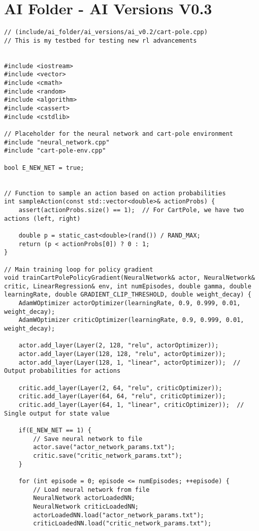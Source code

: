\section*{AI Folder - AI Versions V0.3}
\begin{verbatim}
// (include/ai_folder/ai_versions/ai_v0.2/cart-pole.cpp)
// This is my testbed for testing new rl advancements


#include <iostream>
#include <vector>
#include <cmath>
#include <random>
#include <algorithm>
#include <cassert>
#include <cstdlib>

// Placeholder for the neural network and cart-pole environment
#include "neural_network.cpp"
#include "cart-pole-env.cpp"

bool E_NEW_NET = true;


// Function to sample an action based on action probabilities
int sampleAction(const std::vector<double>& actionProbs) {
    assert(actionProbs.size() == 1);  // For CartPole, we have two actions (left, right)
    
    double p = static_cast<double>(rand()) / RAND_MAX;
    return (p < actionProbs[0]) ? 0 : 1;
}

// Main training loop for policy gradient
void trainCartPolePolicyGradient(NeuralNetwork& actor, NeuralNetwork& critic, LinearRegression& env, int numEpisodes, double gamma, double learningRate, double GRADIENT_CLIP_THRESHOLD, double weight_decay) {
    AdamWOptimizer actorOptimizer(learningRate, 0.9, 0.999, 0.01, weight_decay);
    AdamWOptimizer criticOptimizer(learningRate, 0.9, 0.999, 0.01, weight_decay);

    actor.add_layer(Layer(2, 128, "relu", actorOptimizer));
    actor.add_layer(Layer(128, 128, "relu", actorOptimizer));
    actor.add_layer(Layer(128, 1, "linear", actorOptimizer));  // Output probabilities for actions

    critic.add_layer(Layer(2, 64, "relu", criticOptimizer));
    critic.add_layer(Layer(64, 64, "relu", criticOptimizer));
    critic.add_layer(Layer(64, 1, "linear", criticOptimizer));  // Single output for state value

    if(E_NEW_NET == 1) {
        // Save neural network to file
        actor.save("actor_network_params.txt");
        critic.save("critic_network_params.txt");
    }

    for (int episode = 0; episode <= numEpisodes; ++episode) {
        // Load neural network from file
        NeuralNetwork actorLoadedNN;
        NeuralNetwork criticLoadedNN;
        actorLoadedNN.load("actor_network_params.txt");
        criticLoadedNN.load("critic_network_params.txt");


\end{verbatim}
